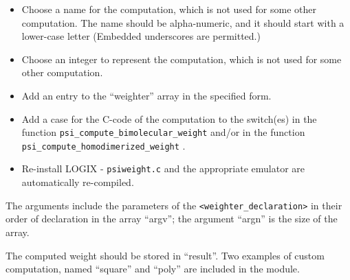 \begin{itemize}
\item Choose a name for the computation, which is not used for some
other computation.  The name should be
alpha-numeric, and it should start with a lower-case letter (Embedded
underscores are permitted.)
\item Choose an integer to represent the computation, which is not used for
some other computation.
\item Add an entry to the ``weighter'' array in the specified form.
\item Add a case for the C-code of the computation to the switch(es)
in the function
\verb+psi_compute_bimolecular_weight+ and/or in the function
\verb+psi_compute_homodimerized_weight+ .
\item Re-install LOGIX - \verb+psiweight.c+ and the
appropriate emulator are automatically re-compiled.
\end{itemize}

\noindent
The arguments include the parameters of the
\verb+<weighter_declaration>+ in their order of declaration in
the array ``argv''; the argument ``argn'' is the size of the
array.

\noindent
The computed weight should be stored in ``result''.  Two
examples of custom computation, named ``square'' and ``poly''
are included in the module.

\newpage







